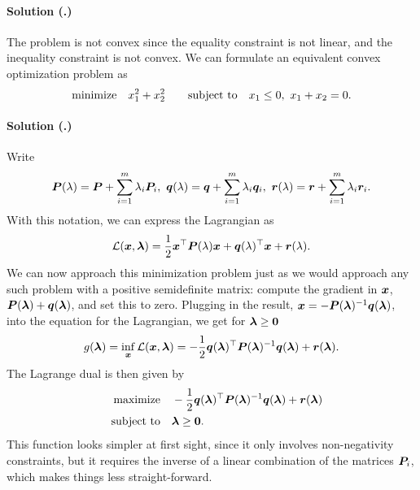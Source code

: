 \documentclass{article}
\newcounter{problemSheetNumber}
\newcounter{problems}
\renewcommand{\solution}[1]{\paragraph{Solution (\theproblemSheetNumber.\theproblems)}\addtocounter{problems}{1}\label{#1}}
\begin{document}
\solution{pr:2} The problem is not convex since the equality constraint is not linear, and the inequality constraint is not convex. We can formulate an equivalent convex optimization problem as
\begin{equation*}
  \text{minimize}\quad x_1^2+x_2^2 \quad \quad\text{subject to}\quad x_1\leq 0, \ x_1+x_2=0.
\end{equation*}

\solution{pr:1} Write
\begin{equation*}
 \bm{P}(\lambda) = \bm{P}+\sum_{i=1}^m\lambda_i \bm{P}_i, \ \bm{q}(\lambda) = \bm{q}+\sum_{i=1}^m \lambda_i \bm{q}_i, \ \bm{r}(\lambda)=\bm{r}+\sum_{i=1}^m \lambda_i\bm{r}_i.
\end{equation*}
With this notation, we can express the Lagrangian as
\begin{equation*}
 \mathcal{L}(\bm{x},\bm{\lambda}) = \frac{1}{2}\bm{x}^{\top}\bm{P}(\lambda)\bm{x}+\bm{q}(\lambda)^{\top}\bm{x}+\bm{r}(\lambda).
\end{equation*}
We can now approach this minimization problem just as we would approach any such problem with a positive semidefinite matrix: compute the gradient in $\bm{x}$, $\bm{P}(\bm{\lambda})+\bm{q}(\bm{\lambda})$, and set this to zero. Plugging in the result, $\bm{x}=-\bm{P}(\bm{\lambda})^{-1}\bm{q}(\bm{\lambda})$, into the equation for the Lagrangian, we get
for $\bm{\lambda}\geq \bm{0}$
\begin{equation*}
 g(\bm{\lambda}) = \inf_{\bm{x}} \mathcal{L}(\bm{x},\bm{\lambda}) = -\frac{1}{2}\bm{q}(\bm{\lambda})^{\top}\bm{P}(\bm{\lambda})^{-1}\bm{q}(\bm{\lambda})+\bm{r}(\bm{\lambda}).
\end{equation*}
The Lagrange dual is then given by
\begin{align*}
\text{maximize}\quad &  -\frac{1}{2}\bm{q}(\bm{\lambda})^{\top}\bm{P}(\bm{\lambda})^{-1}\bm{q}(\bm{\lambda})+\bm{r}(\bm{\lambda})\\
\quad\text{subject to}\quad & \bm{\lambda}\geq \bm{0}.
\end{align*}
This function looks simpler at first sight, since it only involves non-negativity constraints, but it requires the inverse of a linear combination of the matrices $\bm{P}_i$, which makes things less straight-forward.
\end{document}

